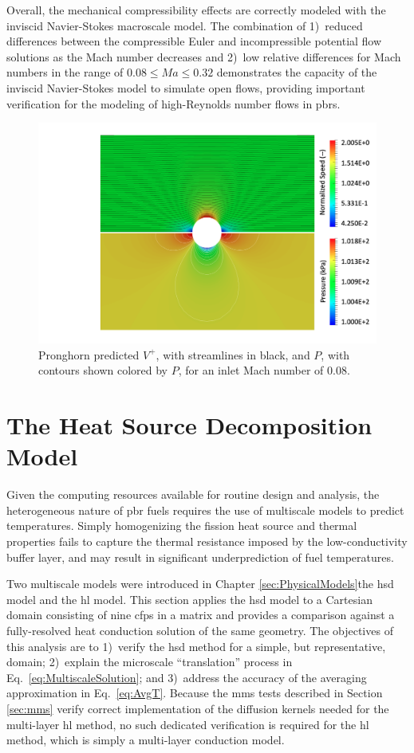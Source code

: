 Overall, the mechanical compressibility effects are correctly modeled with the inviscid Navier-Stokes macroscale model. The combination of 1)~reduced differences between the compressible Euler and incompressible potential flow solutions as the Mach number decreases and 2)~low relative differences for Mach numbers in the range of \(0.08\leq Ma\leq0.32\) demonstrates the capacity of the inviscid Navier-Stokes model to simulate open flows, providing important verification for the modeling of high-Reynolds number flows in \glspl{pbr}.

\begin{figure}[!h]
  \centering
  \includegraphics[width=0.7\linewidth]{figs/pf_Ma08.png}
  \caption{Pronghorn predicted \(V^+\), with streamlines in black, and \(P\), with contours shown colored by \(P\), for an inlet Mach number of 0.08.}
  \label{fig:Ma08}
\end{figure}

\section{The Heat Source Decomposition Model}
\label{sec:verification_meso}

Given the computing resources available for routine design and analysis, the heterogeneous nature of \gls{pbr} fuels requires the use of multiscale models to predict temperatures. Simply homogenizing the fission heat source and thermal properties fails to capture the thermal resistance imposed by the low-conductivity buffer layer, and may result in significant underprediction of fuel temperatures. 

Two multiscale models were introduced in Chapter \ref{sec:PhysicalModels}\mdash the \gls{hsd} model and the \gls{hl} model. This section applies the \gls{hsd} model to a Cartesian domain consisting of nine \glspl{cfp} in a matrix and provides a comparison against a fully-resolved heat conduction solution of the same geometry. The objectives of this analysis are to 1)~verify the \gls{hsd} method for a simple, but representative, domain; 2)~explain the microscale ``translation'' process in Eq.\ \eqref{eq:MultiscaleSolution}; and 3)~address the accuracy of the averaging approximation in Eq.\ \eqref{eq:AvgT}. Because the \gls{mms} tests described in Section \ref{sec:mms} verify correct implementation of the diffusion kernels needed for the multi-layer \gls{hl} method, no such dedicated verification is required for the \gls{hl} method, which is simply a multi-layer conduction model.

